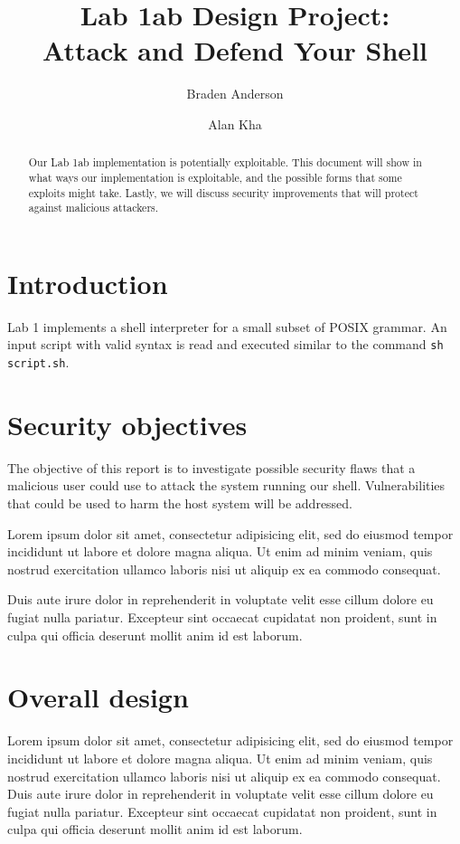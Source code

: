 \documentclass[12pt]{article}
\begin{document}
\lstset{language=C}

\title{Lab 1ab Design Project:\\ Attack and Defend Your Shell}
\author[1]{Braden Anderson}
\author[2]{Alan Kha}

\maketitle

\begin{abstract}
Our Lab 1ab implementation is potentially exploitable. This document will show in what ways our implementation is exploitable, and the possible forms that some exploits might take. Lastly, we will discuss security improvements that will protect against malicious attackers.
\end{abstract}

\section{Introduction}
Lab 1 implements a shell interpreter for a small subset of POSIX grammar. An input script with valid syntax is read and executed similar to the command \texttt{sh script.sh}.

\section{Security objectives}
The objective of this report is to investigate possible security flaws that a malicious user could use to attack the system running our shell. Vulnerabilities that could be used to harm the host system will be addressed.


Lorem ipsum dolor sit amet, consectetur adipisicing elit, sed do eiusmod tempor incididunt ut labore et dolore magna aliqua. Ut enim ad minim veniam, quis nostrud exercitation ullamco laboris nisi ut aliquip ex ea commodo consequat. 

Duis aute irure dolor in reprehenderit in voluptate velit esse cillum dolore eu fugiat nulla pariatur. Excepteur sint occaecat cupidatat non proident, sunt in culpa qui officia deserunt mollit anim id est laborum.

\section{Overall design}
Lorem ipsum dolor sit amet, consectetur adipisicing elit, sed do eiusmod tempor incididunt ut labore et dolore magna aliqua. Ut enim ad minim veniam, quis nostrud exercitation ullamco laboris nisi ut aliquip ex ea commodo consequat. Duis aute irure dolor in reprehenderit in voluptate velit esse cillum dolore eu fugiat nulla pariatur. Excepteur sint occaecat cupidatat non proident, sunt in culpa qui officia deserunt mollit anim id est laborum.
\end{document}
